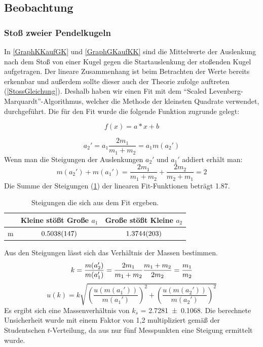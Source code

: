\documentclass[
	a4paper,
	12pt,
	pagesize,
	ngerman
]{scrartcl}
\begin{document}
	\subsection{Beobachtung}

	\subsubsection{Stoß zweier Pendelkugeln}
	In \cref{GraphKKaufGK} und \cref{GraphGKaufKK} sind die Mittelwerte der Auslenkung nach dem Stoß von einer Kugel gegen die Startauslenkung der stoßenden Kugel aufgetragen.
	Der lineare Zusammenhang ist beim Betrachten der Werte bereits erkennbar und außerdem sollte dieser auch der Theorie zufolge auftreten (\cref{StossGleichung}).
	Deshalb haben wir einen Fit mit dem \enquote{Scaled Levenberg-Marquardt}-Algorithmus, welcher die Methode der kleinsten Quadrate verwendet, durchgeführt.
	Die für den Fit wurde die folgende Funktion zugrunde gelegt: %
	
	\begin{equation}
		f(x)=a*x+b
	\end{equation}
	
	\begin{equation}
		\label{StossGleichung}
		a_2' = a_1 \frac{2m_1}{m_1+m_2} = a_1 m(a_2')
	\end{equation}
	Wenn man die Steigungen der Auslenkungen $a_2'$ und $a_1'$ addiert erhält man:
	\begin{equation}
		m(a_2') + m(a_1') = \frac{2m_1}{m_1+m_2} + \frac{2m_2}{m_2+m_1} = 2
	\end{equation}
	Die Summe der Steigungen (\cref{TabelleFits}) der linearen Fit-Funktionen beträgt \SI{1,87}{}.
	\begin{table}[tb]
	\centering
	\begin{tabular}{ l | c | c  }
		& Kleine stößt Große $a_1$ & Große stößt Kleine $a_2$ \\ \hline 
		m &  $\SI{0,5038 \pm 0,0147}{}$ &$\SI{1,3744 \pm 0,0203}{}$  \\
	\end{tabular}
	\caption{Steigungen die sich aus dem Fit ergeben.}
	\label{TabelleFits}
	\end{table}
	Aus den Steigungen lässt sich das Verhältnis der Massen bestimmen.
	\begin{equation}
		k = \frac{m(a_2')}{m(a_1')} = \frac{2m_1}{m_1+m_2} \frac{m_1+m_2}{2m_2} = \frac{m_1}{m_2} \\
	\end{equation}
	\begin{equation}
		u(k) =  k \sqrt{\left(\frac{u(m(a_1'))}{m(a_1')}\right)^2 + \left(\frac{u(m(a_2'))}{m(a_2')}\right)^2 }
		\label{UnsicherheitGleichung}
	\end{equation}
	Es ergibt sich eine Massenverhältnis von $k_s$ =  \SI{2,7281 \pm 0,1068}{}. Die berechnete Unsicherheit wurde mit einem Faktor von 1,2 multipliziert gemäß der Studentschen $t$-Verteilung, da aus nur fünf Messpunkten eine Steigung ermittelt wurde.
	
\end{document}
